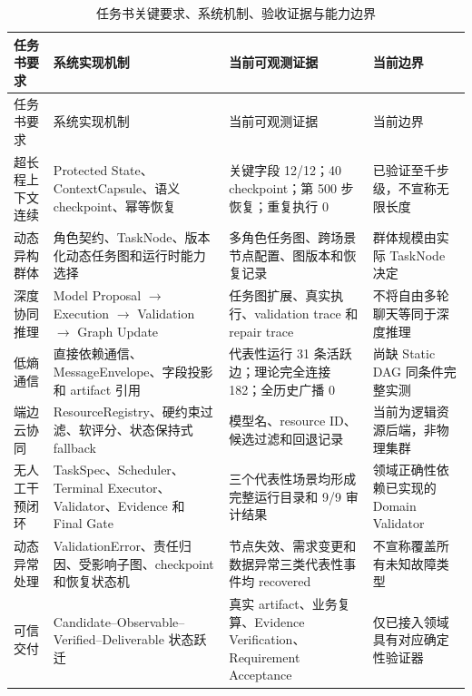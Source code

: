 \documentclass[UTF8,a4paper,12pt,oneside]{ctexbook}
\begin{document}
\begin{longtable}{@{}>{\raggedright\arraybackslash}p{}>{\raggedright\arraybackslash}p{}>{\raggedright\arraybackslash}p{}>{\raggedright\arraybackslash}p{}@{}}
\caption{任务书关键要求、系统机制、验收证据与能力边界}
\label{tab:requirement-evidence-map}\\
\toprule
任务书要求 & 系统实现机制 & 当前可观测证据 & 当前边界\\
\midrule
\endfirsthead

\toprule
任务书要求 & 系统实现机制 & 当前可观测证据 & 当前边界\\
\midrule
\endhead

超长程上下文连续
&
Protected State、ContextCapsule、语义 checkpoint、幂等恢复
&
关键字段 12/12；40 checkpoint；第 500 步恢复；重复执行 0
&
已验证至千步级，不宣称无限长度
\\

动态异构群体
&
角色契约、TaskNode、版本化动态任务图和运行时能力选择
&
多角色任务图、跨场景节点配置、图版本和恢复记录
&
群体规模由实际 TaskNode 决定
\\

深度协同推理
&
Model Proposal $\rightarrow$ Execution $\rightarrow$ Validation $\rightarrow$ Graph Update
&
任务图扩展、真实执行、validation trace 和 repair trace
&
不将自由多轮聊天等同于深度推理
\\

低熵通信
&
直接依赖通信、MessageEnvelope、字段投影和 artifact 引用
&
代表性运行 31 条活跃边；理论完全连接 182；全历史广播 0
&
尚缺 Static DAG 同条件完整实测
\\

端边云协同
&
ResourceRegistry、硬约束过滤、软评分、状态保持式 fallback
&
模型名、resource ID、候选过滤和回退记录
&
当前为逻辑资源后端，非物理集群
\\

无人工干预闭环
&
TaskSpec、Scheduler、Terminal Executor、Validator、Evidence 和 Final Gate
&
三个代表性场景均形成完整运行目录和 9/9 审计结果
&
领域正确性依赖已实现的 Domain Validator
\\

动态异常处理
&
ValidationError、责任归因、受影响子图、checkpoint 和恢复状态机
&
节点失效、需求变更和数据异常三类代表性事件均 recovered
&
不宣称覆盖所有未知故障类型
\\

可信交付
&
Candidate--Observable--Verified--Deliverable 状态跃迁
&
真实 artifact、业务复算、Evidence Verification、Requirement Acceptance
&
仅已接入领域具有对应确定性验证器
\\


\end{longtable}
\end{document}
